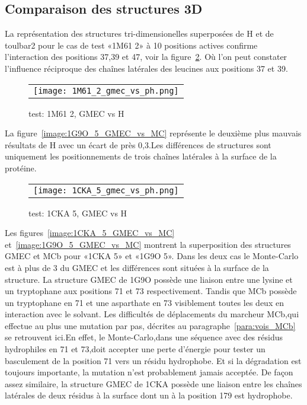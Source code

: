     \clearpage
   \subsection{Comparaison des structures 3D}

La représentation des structures tri-dimensionelles superposées de H et de toulbar2 pour le cas de test «1M61 2» à 10 positions actives confirme l'interaction des positions 37,39 et 47, voir la figure~\ref{image:1CKA_5_GMEC_vs_H}. Où l'on peut constater l'influence réciproque des chaînes latérales des leucines aux positions 37 et 39.

    
    \begin{figure}[h]
      \centering
      \begin{tabular}{c} 
        \texttt{[image: 1M61\_2\_gmec\_vs\_ph.png]} 
      \end{tabular}
      
      \caption{test: 1M61 2, GMEC vs H}
\label{image:1M61_2_GMEC_vs_H}
    \end{figure}
    
La figure~\ref{image:1G9O_5_GMEC_vs_MC} représente le deuxième plus mauvais résultats de H avec un écart de près  0,3.Les différences de structures sont uniquement les positionnements de trois chaînes latérales à la surface de la protéine.

    \begin{figure}[h]
      \centering
      \begin{tabular}{c} 
        \texttt{[image: 1CKA\_5\_gmec\_vs\_ph.png]} 
      \end{tabular}
      
      \caption{test: 1CKA 5, GMEC vs H}
\label{image:1CKA_5_GMEC_vs_H}
    \end{figure}

Les figures~\ref{image:1CKA_5_GMEC_vs_MC} et~\ref{image:1G9O_5_GMEC_vs_MC} montrent la superposition des structures GMEC et MCb pour «1CKA 5» et «1G9O 5». Dans les deux cas le Monte-Carlo est à plus de 3 du GMEC et les différences sont situées à la surface de la structure.
La structure GMEC de 1G9O possède une liaison entre une lysine et un tryptophane aux positions 71 et 73 respectivement. Tandis que MCb possède un tryptophane en 71 et une asparthate en 73 visiblement toutes les deux en interaction avec le solvant. Les difficultés de déplacements du marcheur MCb,qui effectue au plus une mutation par pas, décrites au paragraphe~\ref{para:vois_MCb} se retrouvent ici.En effet, le Monte-Carlo,dans une séquence avec des résidus hydrophiles en 71 et 73,doit accepter une perte d'énergie pour tester un basculement de la position 71 vers un résidu hydrophobe. Et si la dégradation est toujours importante, la mutation n'est probablement jamais acceptée.     
De façon assez similaire, la structure GMEC de 1CKA possède une liaison entre les chaînes latérales de deux résidus à la surface dont un à la position 179 est hydrophobe.


